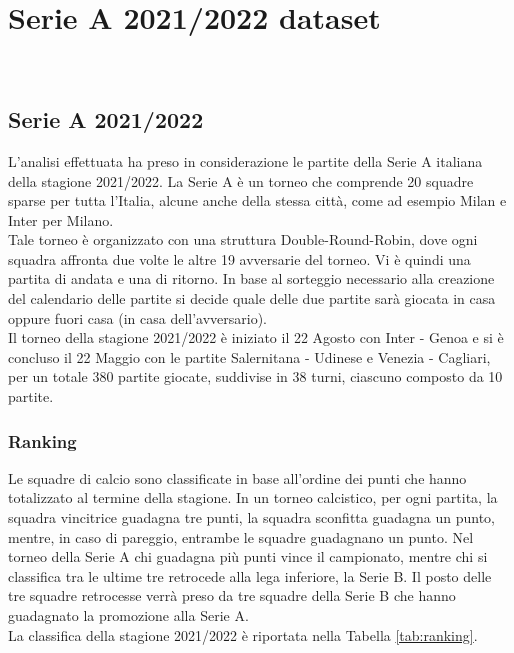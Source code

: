 
\chapter{Serie A 2021/2022 dataset }

\\

\section{Serie A 2021/2022}

L'analisi effettuata ha preso in considerazione le partite della Serie A italiana della stagione 2021/2022. La Serie A è un torneo che comprende 20 squadre sparse per tutta l'Italia, alcune anche della stessa città, come ad esempio Milan e Inter per Milano. \\
Tale torneo è organizzato con una struttura Double-Round-Robin, dove ogni squadra affronta due volte le altre 19 avversarie del torneo. Vi è quindi una partita di andata e una di ritorno. In base al sorteggio necessario alla creazione del calendario delle partite si decide quale delle due partite sarà giocata in casa oppure fuori casa (in casa dell'avversario). \\
Il torneo della stagione 2021/2022 è iniziato il 22 Agosto con Inter - Genoa e si è concluso il 22 Maggio con le partite Salernitana - Udinese e Venezia - Cagliari, per un totale 380 partite giocate, suddivise in 38 turni, ciascuno composto da 10 partite.

\subsection{Ranking}
Le squadre di calcio sono classificate in base all'ordine dei punti che hanno totalizzato al termine della stagione. In un torneo calcistico, per ogni partita, la squadra vincitrice guadagna tre punti, la squadra sconfitta guadagna un punto, mentre, in caso di pareggio, entrambe le squadre guadagnano un punto. Nel torneo della Serie A chi guadagna più punti vince il campionato, mentre chi si classifica tra le ultime tre retrocede alla lega inferiore, la Serie B. Il posto delle tre squadre retrocesse verrà preso da tre squadre della Serie B che hanno guadagnato la promozione alla Serie A.\\ 
La classifica della stagione 2021/2022 è riportata nella Tabella \ref{tab:ranking}.

